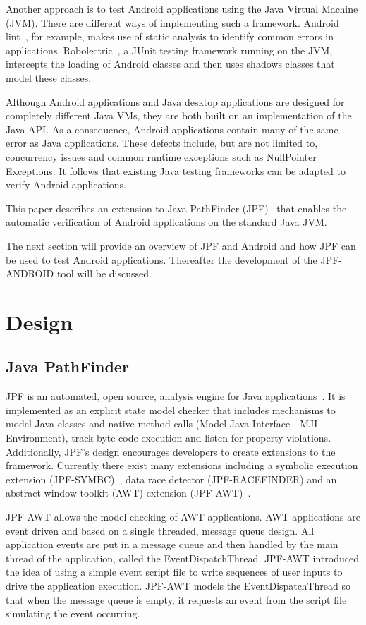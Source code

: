 \documentclass{acm_proc_article-sp}
\begin{document}
Another approach is to test Android applications using the Java Virtual Machine (JVM). There are different ways of implementing such
a framework. Android lint~\cite{lint}, for example, makes use of static analysis to identify common errors in applications.
Robolectric~\cite{robolectric}, a JUnit testing framework running on the JVM,  intercepts the loading of Android classes and then uses
shadows classes that model these classes.

Although Android applications and Java desktop applications are designed for completely different Java VMs, they are both built on an
implementation of the Java API. As a consequence, Android applications contain many of the same error as Java applications. These defects
include, but are not limited to, concurrency issues and common runtime exceptions such as NullPointer Exceptions. It follows that existing
Java testing frameworks can be adapted to verify Android applications.

This paper describes an extension to Java PathFinder (JPF)~\cite{JPFDocs} that enables the automatic verification of Android applications on
the standard Java JVM. 

The next section will provide an overview of JPF and Android and how JPF can be used to test Android applications. Thereafter
the development of the JPF-ANDROID tool will be discussed. 

\section{Design}
\subsection{Java PathFinder}
JPF is an automated, open source, analysis engine for Java applications~\cite{JPFDocs}. It is implemented as an explicit state model checker
that includes mechanisms to model Java classes and native method calls (Model Java Interface - MJI Environment), track byte code execution
and listen for property violations. Additionally, JPF's design encourages developers to create extensions to the framework. Currently there
exist many extensions including a symbolic execution extension (JPF-SYMBC)~\cite{JPF-SYMB}, data race
detector (JPF-RACEFINDER) and an abstract window toolkit (AWT) extension (JPF-AWT)~\cite{JPF-AWT}.

JPF-AWT allows the model checking of AWT applications. AWT applications are event driven and based on a single
threaded, message queue design. All application events are put in a message queue and then handled by the main thread of the application,
called the EventDispatchThread. JPF-AWT introduced the idea of using a simple event script file to write sequences of user inputs to drive
the application execution. JPF-AWT models the EventDispatchThread so that when the message queue is empty, it requests an event from the
script file simulating the event occurring. 
\end{document}
